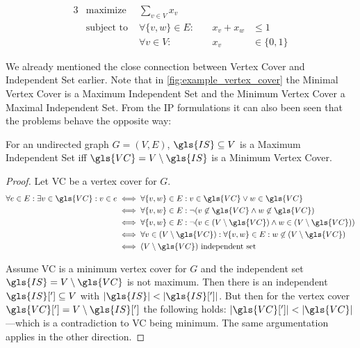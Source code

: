\begin{problem}
  \begin{alignat*}{3}
    &\text{maximize } & \sum\limits_{v \in V} x_v \\
    &\text{subject to } & \forall \{v,w\} \in E : &~& x_v + x_w &\leq 1 \\
    && \forall v \in V : &~& x_v &\in \{0,1\}
  \end{alignat*}
\end{problem}

We already mentioned the close connection between Vertex Cover and
Independent Set earlier. Note that in \cref{fig:example_vertex_cover}
the Minimal Vertex Cover is a Maximum Independent Set and the Minimum
Vertex Cover a Maximal Independent Set. From the \gls{IP} formulations
 it can also been seen that the problems behave the opposite way:

\begin{theorem}
  \label{thm:independent_set_vertex_cover}
  For an undirected graph \(G=(V,E)\), \(\gls{IS} \subseteq V\)
  is a Maximum Independent Set iff
  \(\gls{VC} = V \setminus \gls{IS}\)
  is a Minimum Vertex Cover.
\end{theorem}

\begin{proof}
  Let \gls{VC} be a vertex cover for \(G\). 
  \begin{alignat*}{1}
    \forall e \in E : \exists v \in \gls{VC} : v \in e
    &\iff \forall \{v,w\} \in E :
      v \in \gls{VC} \lor w \in \gls{VC} \\
    &\iff \forall \{v, w\} \in E :
      \lnot(v \not\in \gls{VC} \land w \not\in \gls{VC}) \\
    &\iff \forall \{v, w\} \in E :
      \lnot(v \in (V \setminus \gls{VC})
        \land w \in (V \setminus \gls{VC})) \\
    &\iff \forall v \in (V \setminus \gls{VC}) :
      \forall \{v, w\} \in E :
      w \not\in (V \setminus \gls{VC}) \\
    &\iff (V \setminus \gls{VC}) \text{ independent set}
  \end{alignat*}
  
  Assume \gls{VC} is a minimum vertex cover for \(G\) and the
  independent set \(\gls{IS} = V \setminus \gls{VC}\) is not maximum.
  Then there is an independent \(\gls{IS}['] \subseteq V\) with
  \(|\gls{IS}| < |\gls{IS}[']|\). But then for the vertex cover
  \(\gls{VC}['] = V \setminus \gls{IS}[']\) the following holds:
  \(|\gls{VC}[']| < |\gls{VC}|\)---which is a contradiction to
  \gls{VC} being minimum. The same argumentation applies in the other
  direction.
\end{proof}

